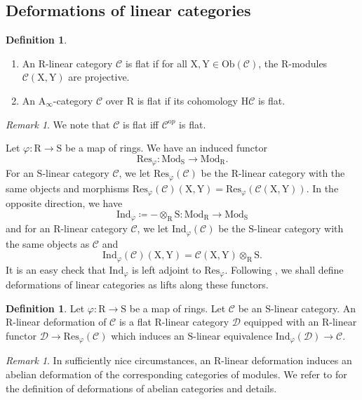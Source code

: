 \documentclass{article}
\theoremstyle{plain}
\theoremstyle{definition}
\newtheorem{definition}[theorem]{Definition}
\theoremstyle{remark}
\newtheorem{remark}[theorem]{Remark}
\newcommand{\mr}{\mathrm}
\newcommand{\Aa}{\mr{A}_{\infty}}
\newcommand{\Cc}{\mathcal C}
\newcommand{\3}{\vspace{3mm}}
\newcommand{\2}{\vspace{2mm}}
\newcommand{\1}{\vspace{1mm}}
\begin{document}
\subsection{Deformations of linear categories}

\begin{definition}
\begin{enumerate}
\item An $\mr{R}$-linear category $\Cc$ is flat if for all $\mr{X,Y}\in \mr{Ob}(\Cc)$, the $\mr{R}$-modules $\Cc(\mr{X,Y})$ are projective.
\item An $\Aa$-category $\Cc$ over $\mr{R}$ is flat if its cohomology $\mr{H}\Cc$ is flat.
\end{enumerate}
\end{definition}
\2
\begin{remark}
We note that $\Cc$ is flat iff $\Cc^{\mr op}$ is flat.
\end{remark}
Let $\varphi : \mr{R}\to \mr{S}$ be a map of rings. We have an induced functor $$\mr{Res}_\varphi : \mr{Mod}_\mr{S}\to \mr{Mod}_\mr{R}.$$ For an $\mr{S}$-linear category $\Cc$, we let $\mr{Res}_\varphi(\Cc)$ be the $\mr{R}$-linear category with the same objects and morphisms $\mr{Res}_\varphi(\Cc)(\mr{X,Y})=\mr{Res}_\varphi(\Cc(\mr{X,Y}))$. In the opposite direction, we have $$\mr{Ind}_\varphi\coloneqq-\otimes_{\mr{R}}\mr{S} :\mr{Mod}_\mr{R}\to \mr{Mod}_\mr{S}$$ and for an $\mr{R}$-linear category $\Cc$, we let $\mr{Ind}_\varphi(\Cc)$ be the $\mr{S}$-linear category with the same objects as $\Cc$ and $$\mr{Ind}_\varphi(\Cc)(\mr{X,Y})=\Cc(\mr{X,Y})\otimes_\mr{R}\mr{S}.$$
It is an easy check that $\mr{Ind}_\varphi$ is left adjoint to $\mr{Res}_\varphi$. Following \cite{MR2238922}, we shall define deformations of linear categories as lifts along these functors.
\2
\begin{definition}
Let $\varphi:\mr{R}\to\mr{S}$ be a map of rings. Let $\Cc$ be an $\mr S$-linear category. An $\mr{R}$-linear deformation of $\Cc$ is a flat $\mr R$-linear category $\mathcal{D}$ equipped with an $\mr{R}$-linear functor $\mathcal{D}\to \mr{Res}_\varphi(\Cc)$ which induces an $\mr{S}$-linear equivalence $\mr{Ind}_\varphi(\mathcal{D})\to \Cc$. 
\end{definition}
\2
\begin{remark}
In sufficiently nice circumstances, an $\mr{R}$-linear deformation induces an abelian deformation of the corresponding categories of modules. We refer to \cite{MR2238922} for the definition of deformations of abelian categories and details.
\end{remark}
\end{document}
